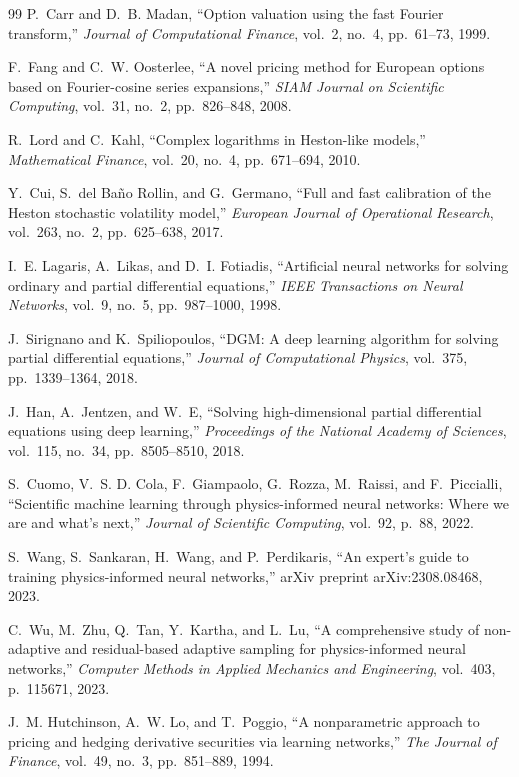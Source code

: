 \documentclass[conference]{IEEEtran}
\begin{document}
\begin{thebibliography}{99}
 P.~Carr and D.~B. Madan, ``Option valuation using the fast Fourier transform,'' \emph{Journal of Computational Finance}, vol.~2, no.~4, pp.~61--73, 1999.

 F.~Fang and C.~W. Oosterlee, ``A novel pricing method for European options based on Fourier-cosine series expansions,'' \emph{SIAM Journal on Scientific Computing}, vol.~31, no.~2, pp.~826--848, 2008.

 R.~Lord and C.~Kahl, ``Complex logarithms in Heston-like models,'' \emph{Mathematical Finance}, vol.~20, no.~4, pp.~671--694, 2010.

 Y.~Cui, S.~del Ba\~{n}o Rollin, and G.~Germano, ``Full and fast calibration of the Heston stochastic volatility model,'' \emph{European Journal of Operational Research}, vol.~263, no.~2, pp.~625--638, 2017.

 I.~E. Lagaris, A.~Likas, and D.~I. Fotiadis, ``Artificial neural networks for solving ordinary and partial differential equations,'' \emph{IEEE Transactions on Neural Networks}, vol.~9, no.~5, pp.~987--1000, 1998.

 J.~Sirignano and K.~Spiliopoulos, ``DGM: A deep learning algorithm for solving partial differential equations,'' \emph{Journal of Computational Physics}, vol.~375, pp.~1339--1364, 2018.

 J.~Han, A.~Jentzen, and W.~E, ``Solving high-dimensional partial differential equations using deep learning,'' \emph{Proceedings of the National Academy of Sciences}, vol.~115, no.~34, pp.~8505--8510, 2018.

 S.~Cuomo, V.~S. D. Cola, F.~Giampaolo, G.~Rozza, M.~Raissi, and F.~Piccialli, ``Scientific machine learning through physics-informed neural networks: Where we are and what's next,'' \emph{Journal of Scientific Computing}, vol.~92, p.~88, 2022.

 S.~Wang, S.~Sankaran, H.~Wang, and P.~Perdikaris, ``An expert's guide to training physics-informed neural networks,'' arXiv preprint arXiv:2308.08468, 2023.

 C.~Wu, M.~Zhu, Q.~Tan, Y.~Kartha, and L.~Lu, ``A comprehensive study of non-adaptive and residual-based adaptive sampling for physics-informed neural networks,'' \emph{Computer Methods in Applied Mechanics and Engineering}, vol.~403, p.~115671, 2023.

 J.~M. Hutchinson, A.~W. Lo, and T.~Poggio, ``A nonparametric approach to pricing and hedging derivative securities via learning networks,'' \emph{The Journal of Finance}, vol.~49, no.~3, pp.~851--889, 1994.


\end{thebibliography}
\end{document}
